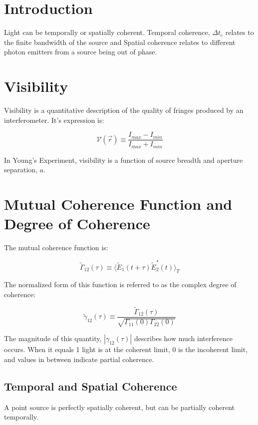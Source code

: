 \documentclass[12pt]{report}
\begin{document}
\section{Introduction}
Light can be temporally or spatially coherent. Temporal coherence, $\Delta t_c$ relates to the finite bandwidth of the source and Spatial coherence relates to different photon emitters from a source being out of phase. 

\section{Visibility}
Visibility is a quantitative description of the quality of fringes produced by an interferometer. It's expression is: 

\begin{equation}
\mathcal{V}( \vec{r}) \equiv \frac{I_{max} - I_{min}}{I_{max} + I_{min}}
\end{equation}

In Young's Experiment, visibility is a function of source breadth and aperture separation, $a$.

\section{Mutual Coherence Function and Degree of Coherence}
The mutual coherence function is: 

\begin{equation}
\tilde{\Gamma}_{12}(\tau) \equiv \langle \tilde{E}_1(t + \tau) \tilde{E}_2 ^* (t) \rangle _T
\end{equation}

The normalized form of this function is referred to as the complex degree of coherence: 

\begin{equation}
\tilde{\gamma}_{12} (\tau) \equiv \frac{\tilde{\Gamma}_{12}(\tau)}{\sqrt{\Gamma_{11}(0)\Gamma_{22}(0)}} 
\end{equation}

The magnitude of this quantity, $| \gamma_{12}(\tau) |$ describes how much interference occurs. When it equals 1 light is at the coherent limit, 0 is the incoherent limit, and values in between indicate partial coherence. 

\subsection{Temporal and Spatial Coherence}
A point source is perfectly spatially coherent, but can be partially coherent temporally. 
\end{document}
